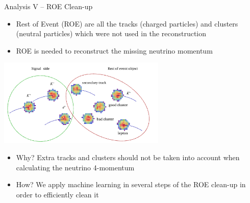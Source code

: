 \documentclass[serif]{beamer}
\begin{document}
\begin{frame}[t]{Analysis V -- ROE Clean-up}
\vspace{-3mm}
\small

\begin{itemize}
	\item Rest of Event (ROE) are all the tracks (charged particles) and clusters (neutral particles) which were not used in the reconstruction
	\item ROE is needed to reconstruct the missing neutrino momentum
\end{itemize}
\begin{center}
	\includegraphics[width=0.6\textwidth]{fig/recon_5}
\end{center}

\vspace{-2mm}
\begin{block}{}
\begin{itemize}
	\item Why? Extra tracks and clusters should not be taken into account when calculating the neutrino 4-momentum
	\item How? We apply machine learning in several steps of the ROE clean-up in order to efficiently clean it
\end{itemize}
\end{block}

\end{frame}

\end{document}
